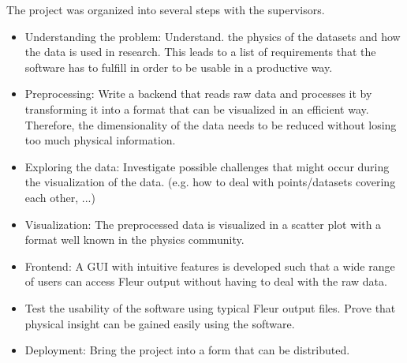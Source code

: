 The project was organized into several steps with the supervisors.
\begin{itemize}
\item Understanding the problem: Understand. the physics of the datasets and how
    the data is used in research. This leads to a list of requirements that the
    software has to fulfill in order to be usable in a productive way.
\item Preprocessing: Write a backend that reads raw data and processes it by transforming it into a format that can be visualized in an efficient way. Therefore, the dimensionality of the data needs to be reduced without losing too much physical information.
\item Exploring the data: Investigate possible challenges that might occur during the visualization of the data. (e.g. how to deal with points/datasets covering each other, ...)
\item Visualization: The preprocessed data is visualized in a scatter plot with
    a format well known in the physics community.
\item Frontend: A GUI with intuitive features is developed such that a wide
    range of users can access Fleur output without having to deal with the raw data. 
\item Test the usability of the software using typical Fleur output files. Prove that physical insight can be gained easily using the software.
\item Deployment: Bring the project into a form that can be distributed.
\end{itemize}


